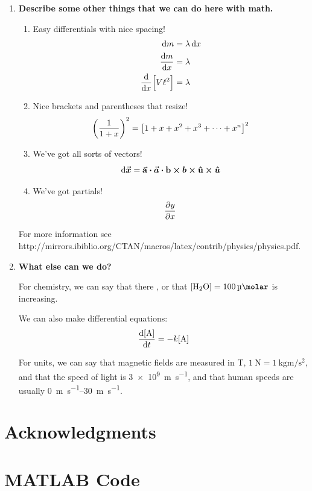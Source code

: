 \documentclass{lab}
\begin{document}
\begin{enumerate}
\item \textbf{Describe some other things that we can do here with math.}
  \begin{enumerate}
  \item Easy differentials with nice spacing!
    \begin{align}
      \dd{m} &= \lambda \dd{x} \\
      \dv{m}{x} &= \lambda \\
      \dv{x}\qty\Big[V\ell^2] &= \lambda
    \end{align}

  \item Nice brackets and parentheses that resize!
    \begin{equation}
      \qty(\frac{1}{1 + x})^2 = \qty[1 + x + x^2 + x^3 + \cdots + x^n]^2
    \end{equation}

  \item We've got all sorts of vectors!
    \begin{equation}
      \dd{\va*{x}} = \va{a} \vdot \va*{a} \vdot \vb{b} \cross \vb*{b} \cross \vu{u} \cross \vu*{u}
    \end{equation} 

  \item We've got partials!
    \begin{equation}
      \pdv{y}{x}
    \end{equation}
  \end{enumerate}
  
  For more information see http://mirrors.ibiblio.org/CTAN/macros/latex/contrib/physics/physics.pdf.

\item \textbf{What else can we do?}

  For chemistry, we can say that there , or that
  \(\conc{H2O} = \SI{100}{\micro\molar}\) is increasing.

  We can also make differential equations:
  \begin{equation}
    \dv{\conc{A}}{t} = -k\conc{A}
  \end{equation}

  For units, we can say that magnetic fields are measured in
  \si{\tesla}, $\SI{1}{\newton} =
  \SI{1}{\kilo\gram\meter\per\second\squared}$, and that the speed of
  light is \SI{3e9}{\meter\per\second}, and that human speeds are
  usually \SIrange{0}{30}{\meter\per\second}.
\end{enumerate}

\section{Acknowledgments}
\label{Sec:Ack}


\section{MATLAB Code}
\label{Sec:MATLAB}


\end{document}
